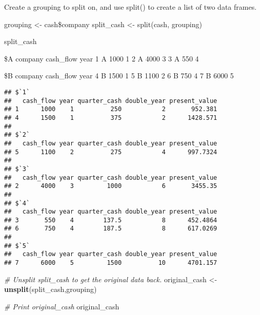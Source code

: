 \documentclass[]{article}
\newenvironment{Shaded}{\begin{snugshade}}{\end{snugshade}}
\newcommand{\KeywordTok}[1]{\textcolor[rgb]{0.13,0.29,0.53}{\textbf{#1}}}
\newcommand{\StringTok}[1]{\textcolor[rgb]{0.31,0.60,0.02}{#1}}
\newcommand{\CommentTok}[1]{\textcolor[rgb]{0.56,0.35,0.01}{\textit{#1}}}
\newcommand{\OperatorTok}[1]{\textcolor[rgb]{0.81,0.36,0.00}{\textbf{#1}}}
\newcommand{\NormalTok}[1]{#1}
\begin{document}
Create a grouping to split on, and use split() to create a list of two
data frames.

grouping \textless{}- cash\$company split\_cash \textless{}- split(cash,
grouping)

split\_cash

\$A company cash\_flow year 1 A 1000 1 2 A 4000 3 3 A 550 4

\$B company cash\_flow year 4 B 1500 1 5 B 1100 2 6 B 750 4 7 B 6000 5

\begin{Shaded}
\end{Shaded}

\begin{verbatim}
## $`1`
##   cash_flow year quarter_cash double_year present_value
## 1      1000    1          250           2       952.381
## 4      1500    1          375           2      1428.571
## 
## $`2`
##   cash_flow year quarter_cash double_year present_value
## 5      1100    2          275           4      997.7324
## 
## $`3`
##   cash_flow year quarter_cash double_year present_value
## 2      4000    3         1000           6       3455.35
## 
## $`4`
##   cash_flow year quarter_cash double_year present_value
## 3       550    4        137.5           8      452.4864
## 6       750    4        187.5           8      617.0269
## 
## $`5`
##   cash_flow year quarter_cash double_year present_value
## 7      6000    5         1500          10      4701.157
\end{verbatim}

\begin{Shaded}
\begin{Highlighting}[]
\CommentTok{# Unsplit split_cash to get the original data back.}
\NormalTok{original_cash <-}\StringTok{ }\KeywordTok{unsplit}\NormalTok{(split_cash,grouping)}

\CommentTok{# Print original_cash}
\NormalTok{original_cash}
\end{Highlighting}
\end{Shaded}
\end{document}
